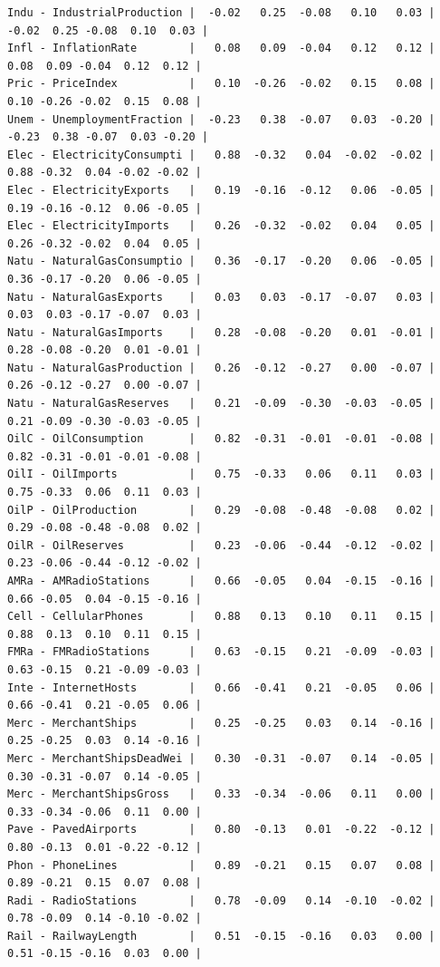 \documentclass[a4paper,10pt,twocolumn]{article}
\begin{document}
\begin{landscape}
\begin{verbatim}
Indu - IndustrialProduction |  -0.02   0.25  -0.08   0.10   0.03 | -0.02  0.25 -0.08  0.10  0.03 |
Infl - InflationRate        |   0.08   0.09  -0.04   0.12   0.12 |  0.08  0.09 -0.04  0.12  0.12 |
Pric - PriceIndex           |   0.10  -0.26  -0.02   0.15   0.08 |  0.10 -0.26 -0.02  0.15  0.08 |
Unem - UnemploymentFraction |  -0.23   0.38  -0.07   0.03  -0.20 | -0.23  0.38 -0.07  0.03 -0.20 |
Elec - ElectricityConsumpti |   0.88  -0.32   0.04  -0.02  -0.02 |  0.88 -0.32  0.04 -0.02 -0.02 |
Elec - ElectricityExports   |   0.19  -0.16  -0.12   0.06  -0.05 |  0.19 -0.16 -0.12  0.06 -0.05 |
Elec - ElectricityImports   |   0.26  -0.32  -0.02   0.04   0.05 |  0.26 -0.32 -0.02  0.04  0.05 |
Natu - NaturalGasConsumptio |   0.36  -0.17  -0.20   0.06  -0.05 |  0.36 -0.17 -0.20  0.06 -0.05 |
Natu - NaturalGasExports    |   0.03   0.03  -0.17  -0.07   0.03 |  0.03  0.03 -0.17 -0.07  0.03 |
Natu - NaturalGasImports    |   0.28  -0.08  -0.20   0.01  -0.01 |  0.28 -0.08 -0.20  0.01 -0.01 |
Natu - NaturalGasProduction |   0.26  -0.12  -0.27   0.00  -0.07 |  0.26 -0.12 -0.27  0.00 -0.07 |
Natu - NaturalGasReserves   |   0.21  -0.09  -0.30  -0.03  -0.05 |  0.21 -0.09 -0.30 -0.03 -0.05 |
OilC - OilConsumption       |   0.82  -0.31  -0.01  -0.01  -0.08 |  0.82 -0.31 -0.01 -0.01 -0.08 |
OilI - OilImports           |   0.75  -0.33   0.06   0.11   0.03 |  0.75 -0.33  0.06  0.11  0.03 |
OilP - OilProduction        |   0.29  -0.08  -0.48  -0.08   0.02 |  0.29 -0.08 -0.48 -0.08  0.02 |
OilR - OilReserves          |   0.23  -0.06  -0.44  -0.12  -0.02 |  0.23 -0.06 -0.44 -0.12 -0.02 |
AMRa - AMRadioStations      |   0.66  -0.05   0.04  -0.15  -0.16 |  0.66 -0.05  0.04 -0.15 -0.16 |
Cell - CellularPhones       |   0.88   0.13   0.10   0.11   0.15 |  0.88  0.13  0.10  0.11  0.15 |
FMRa - FMRadioStations      |   0.63  -0.15   0.21  -0.09  -0.03 |  0.63 -0.15  0.21 -0.09 -0.03 |
Inte - InternetHosts        |   0.66  -0.41   0.21  -0.05   0.06 |  0.66 -0.41  0.21 -0.05  0.06 |
Merc - MerchantShips        |   0.25  -0.25   0.03   0.14  -0.16 |  0.25 -0.25  0.03  0.14 -0.16 |
Merc - MerchantShipsDeadWei |   0.30  -0.31  -0.07   0.14  -0.05 |  0.30 -0.31 -0.07  0.14 -0.05 |
Merc - MerchantShipsGross   |   0.33  -0.34  -0.06   0.11   0.00 |  0.33 -0.34 -0.06  0.11  0.00 |
Pave - PavedAirports        |   0.80  -0.13   0.01  -0.22  -0.12 |  0.80 -0.13  0.01 -0.22 -0.12 |
Phon - PhoneLines           |   0.89  -0.21   0.15   0.07   0.08 |  0.89 -0.21  0.15  0.07  0.08 |
Radi - RadioStations        |   0.78  -0.09   0.14  -0.10  -0.02 |  0.78 -0.09  0.14 -0.10 -0.02 |
Rail - RailwayLength        |   0.51  -0.15  -0.16   0.03   0.00 |  0.51 -0.15 -0.16  0.03  0.00 |

\end{verbatim}
\end{landscape}
\end{document}
